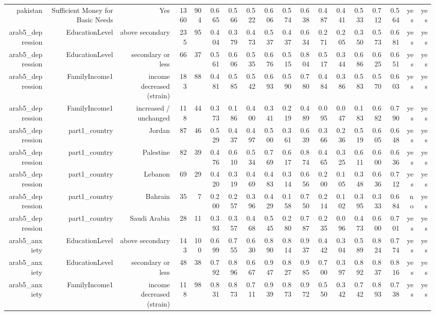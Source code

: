 \documentclass[10pt]{article}
\begin{document}
\begin{longtable}{rrrrrrrrrrrrrrrrrr}
pakistan & Sufficient Money for Basic Needs & Yes & 1360 & 904 & 0.665 & 0.566 & 0.522 & 0.606 & 0.574 & 0.638 & 0.487 & 0.441 & 0.533 & 0.712 & 0.564 & yes & yes \\
arab5\_depression & EducationLevel & above secondary & 235 & 95 & 0.404 & 0.379 & 0.473 & 0.537 & 0.437 & 0.634 & 0.271 & 0.205 & 0.350 & 0.573 & 0.681 & yes & yes \\
arab5\_depression & EducationLevel & secondary or less & 66 & 37 & 0.561 & 0.606 & 0.535 & 0.676 & 0.515 & 0.804 & 0.517 & 0.344 & 0.686 & 0.625 & 0.651 & yes & yes \\
arab5\_depression & FamilyIncome1 & income decreased (strain) & 183 & 88 & 0.481 & 0.585 & 0.542 & 0.693 & 0.590 & 0.780 & 0.484 & 0.386 & 0.583 & 0.570 & 0.603 & yes & yes \\
arab5\_depression & FamilyIncome1 & increased / unchanged & 118 & 44 & 0.373 & 0.186 & 0.400 & 0.341 & 0.219 & 0.489 & 0.095 & 0.047 & 0.183 & 0.682 & 0.790 & yes & yes \\
arab5\_depression & part1\_country & Jordan & 87 & 46 & 0.529 & 0.437 & 0.497 & 0.500 & 0.361 & 0.639 & 0.366 & 0.236 & 0.519 & 0.605 & 0.648 & yes & yes \\
arab5\_depression & part1\_country & Palestine & 82 & 39 & 0.476 & 0.610 & 0.534 & 0.769 & 0.617 & 0.874 & 0.465 & 0.325 & 0.611 & 0.600 & 0.636 & yes & yes \\
arab5\_depression & part1\_country & Lebanon & 69 & 29 & 0.420 & 0.319 & 0.469 & 0.483 & 0.314 & 0.656 & 0.200 & 0.105 & 0.348 & 0.636 & 0.712 & yes & yes \\
arab5\_depression & part1\_country & Bahrain & 35 & 7 & 0.200 & 0.257 & 0.396 & 0.429 & 0.158 & 0.750 & 0.214 & 0.102 & 0.395 & 0.333 & 0.684 & no & yes \\
arab5\_depression & part1\_country & Saudi Arabia & 28 & 11 & 0.393 & 0.357 & 0.468 & 0.545 & 0.280 & 0.787 & 0.235 & 0.096 & 0.473 & 0.600 & 0.701 & yes & yes \\
arab5\_anxiety & EducationLevel & above secondary & 143 & 100 & 0.699 & 0.755 & 0.630 & 0.890 & 0.814 & 0.937 & 0.442 & 0.304 & 0.589 & 0.824 & 0.774 & yes & yes \\
arab5\_anxiety & EducationLevel & secondary or less & 48 & 38 & 0.792 & 0.896 & 0.667 & 0.947 & 0.827 & 0.985 & 0.700 & 0.397 & 0.892 & 0.837 & 0.816 & yes & yes \\
arab5\_anxiety & FamilyIncome1 & income decreased (strain) & 118 & 98 & 0.831 & 0.873 & 0.711 & 0.939 & 0.873 & 0.972 & 0.550 & 0.342 & 0.742 & 0.893 & 0.738 & yes & yes \\

\end{longtable}
\end{document}

